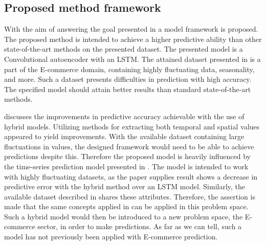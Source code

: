 \subsection{Proposed method framework}


With the aim of answering the goal presented in  a model framework is proposed.
The proposed method is intended to achieve a higher predictive ability than other state-of-the-art methods on the presented dataset.
The presented model is a Convolutional autoencoder with an LSTM.
The attained dataset presented in 
is a part of the E-commerce domain, containing highly fluctuating data, seasonality, and more.
Such a dataset presents difficulties in prediction with high accuracy. The specified model should attain better results than standard state-of-the-art methods.

 discusses the improvements in predictive accuracy achievable with the use of hybrid models.
Utilizing methods for extracting both temporal and spatial values appeared to yield improvements.
With the available dataset containing large fluctuations in values, the designed framework would need to be able to achieve predictions despite this.
Therefore the proposed model is heavily influenced by the time-series prediction model presented in \cite{Zhao2019}.
The model is intended to work with highly fluctuating datasets, as the paper supplies result shows a decrease in predictive error with the hybrid method over an LSTM model.
Similarly, the available dataset described in
 shares these attributes.
Therefore, the assertion is made that the same concepts applied in \cite{Zhao2019} can be applied in this problem space.
Such a hybrid model would then be introduced to a new problem space, the E-commerce sector, in order to make predictions.
As far as we can tell, such a model has not previously been applied with E-commerce prediction.

